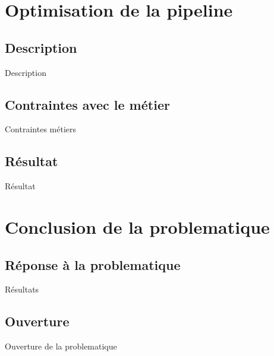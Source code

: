 \section*{Optimisation de la pipeline}
    \subsection*{Description}
    Description 

    \subsection*{Contraintes avec le métier}
    Contraintes métiers

    \subsection*{Résultat}
    Résultat



\section*{Conclusion de la problematique}
    \subsection*{Réponse à la problematique}
    Résultats
    
    \subsection*{Ouverture}
    Ouverture de la problematique